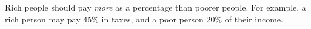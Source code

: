 Rich people should pay \emph{more} as a percentage than poorer people.
For example, a rich person may pay 45\% in taxes, and a poor person 20\% of their income.
